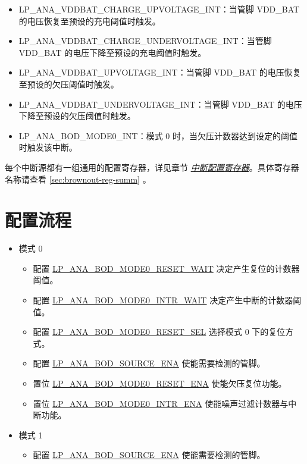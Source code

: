 \documentclass[main\_\_CN.tex]{subfiles}
\begin{document}
\begin{itemize}
\item \label{int:LPANAVDDBATCHARGEUPVOLTAGEINT}LP\_ANA\_VDDBAT\_CHARGE\_UPVOLTAGE\_INT：当管脚 VDD\_BAT 的电压恢复至预设的充电阈值时触发。
\item \label{int:LPANAVDDBATCHARGEUNDERVOLTAGEINT}LP\_ANA\_VDDBAT\_CHARGE\_UNDERVOLTAGE\_INT：当管脚 VDD\_BAT 的电压下降至预设的充电阈值时触发。
\item \label{int:LPANAVDDBATUPVOLTAGEINT}LP\_ANA\_VDDBAT\_UPVOLTAGE\_INT：当管脚 VDD\_BAT 的电压恢复至预设的欠压阈值时触发。
\item \label{int:LPANAVDDBATUNDERVOLTAGEINT}LP\_ANA\_VDDBAT\_UNDERVOLTAGE\_INT：当管脚 VDD\_BAT 的电压下降至预设的欠压阈值时触发。
\item \label{int:LPANABODMODE0INT}LP\_ANA\_BOD\_MODE0\_INT：模式 0 时，当欠压计数器达到设定的阈值时触发该中断。
\end{itemize}

每个中断源都有一组通用的配置寄存器，详见章节 \hyperref[interrupt-config-registers]{\textit{中断配置寄存器}}。具体寄存器名称请查看 \ref{sec:brownout-reg-summ} \textit{}。


\section{配置流程}

\begin{itemize}
    \item 模式 0

    \begin{itemize}
        \item 配置 \hyperref[fielddesc:LPANABODMODE0RESETWAIT]{LP\_ANA\_BOD\_MODE0\_RESET\_WAIT} 决定产生复位的计数器阈值。
        \item 配置 \hyperref[fielddesc:LPANABODMODE0INTRWAIT]{LP\_ANA\_BOD\_MODE0\_INTR\_WAIT} 决定产生中断的计数器阈值。
        \item 配置 \hyperref[fielddesc:LPANABODMODE0RESETSEL]{LP\_ANA\_BOD\_MODE0\_RESET\_SEL} 选择模式 0 下的复位方式。

        \item 配置 \hyperref[fielddesc:LPANABODSOURCEENA]{LP\_ANA\_BOD\_SOURCE\_ENA} 使能需要检测的管脚。
        \item 置位 \hyperref[fielddesc:LPANABODMODE0RESETENA]{LP\_ANA\_BOD\_MODE0\_RESET\_ENA} 使能欠压复位功能。
        \item 置位 \hyperref[fielddesc:LPANABODMODE0INTRENA]{LP\_ANA\_BOD\_MODE0\_INTR\_ENA} 使能噪声过滤计数器与中断功能。
    \end{itemize}

    \item 模式 1

    \begin{itemize}
        \item 配置 \hyperref[fielddesc:LPANABODSOURCEENA]{LP\_ANA\_BOD\_SOURCE\_ENA} 使能需要检测的管脚。
    \end{itemize}

\end{itemize}
\end{document}
